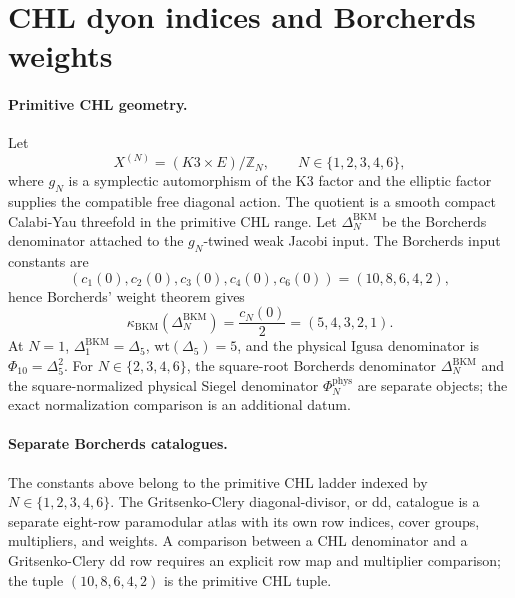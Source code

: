 
\providecommand{\kBKM}{\kappa_{\mathrm{BKM}}}
\providecommand{\kch}{\kappa_{\mathrm{ch}}}
\providecommand{\kcat}{\kappa_{\mathrm{cat}}}
\providecommand{\kfib}{\kappa_{\mathrm{fiber}}}
\providecommand{\DBKM}{\Delta^{\mathrm{BKM}}}
\providecommand{\PhiPhys}{\Phi^{\mathrm{phys}}}
\providecommand{\AdS}{\mathrm{AdS}}
\providecommand{\Tr}{\mathrm{Tr}}

\section*{CHL dyon indices and Borcherds weights}
\label{wn:sec:chl-bps-bkm}

\paragraph{Primitive CHL geometry.}
Let
\[
  X^{(N)}=(K3\times E)/\mathbb{Z}_N,\qquad
  N\in\{1,2,3,4,6\},
\]
where \(g_N\) is a symplectic automorphism of the K3 factor and the
elliptic factor supplies the compatible free diagonal action. The
quotient is a smooth compact Calabi-Yau threefold in the primitive CHL
range. Let \(\DBKM_N\) be the Borcherds denominator attached to the
\(g_N\)-twined weak Jacobi input. The Borcherds input constants are
\[
  (c_1(0),c_2(0),c_3(0),c_4(0),c_6(0))
  =
  (10,8,6,4,2),
\]
hence Borcherds' weight theorem gives
\[
  \kBKM(\DBKM_N)=\frac{c_N(0)}2=(5,4,3,2,1).
\]
At \(N=1\), \(\DBKM_1=\Delta_5\), \(\mathrm{wt}(\Delta_5)=5\), and the
physical Igusa denominator is \(\Phi_{10}=\Delta_5^2\). For
\(N\in\{2,3,4,6\}\), the square-root Borcherds denominator \(\DBKM_N\)
and the square-normalized physical Siegel denominator \(\PhiPhys_N\)
are separate objects; the exact normalization comparison is an
additional datum.

\paragraph{Separate Borcherds catalogues.}
The constants above belong to the primitive CHL ladder indexed by
\(N\in\{1,2,3,4,6\}\). The Gritsenko-Clery diagonal-divisor, or dd,
catalogue is a separate eight-row paramodular atlas with its own row
indices, cover groups, multipliers, and weights. A comparison between a
CHL denominator and a Gritsenko-Clery dd row requires an explicit row
map and multiplier comparison; the tuple \((10,8,6,4,2)\) is the
primitive CHL tuple.


